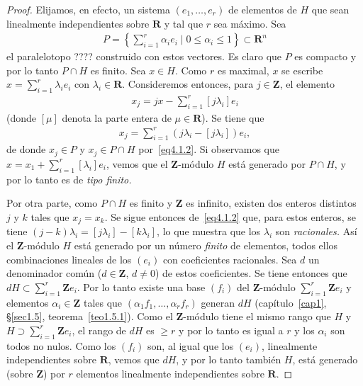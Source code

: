 \documentclass[oneside,bibtotoc,leqno,spanish]{amsbook}
\newcommand{\RR}{\mathbf{R}}
\newcommand{\ZZ}{\mathbf{Z}}
\numberwithin{equation}{section}
\theoremstyle{defi}
\theoremstyle{note}
\theoremstyle{rem}
\numberwithin{theorem}{section}
\numberwithin{proposition}{section}
\numberwithin{definition}{section}
\numberwithin{lemma}{section}
\numberwithin{corollary}{section}
\numberwithin{example}{section}
\numberwithin{footnote}{section}%
\begin{document}
\begin{proof}
Elijamos, en efecto, un sistema $(e_{1},\dots,e_{r})$ de elementos de $H$ que sean linealmente independientes
sobre $\RR$ y tal que $r$ sea m\'aximo. Sea
\begin{gather}
P = \left\{\sum_{i=1}^{r}\alpha_{i}e_{i}\mid 0\leq\alpha_{i}\leq 1\right\}\subset\RR^{n}
\end{gather}
el paralelotopo ???? construido con estos vectores. Es claro que $P$ es compacto y por lo tanto
$P\cap H$ es finito. Sea $x\in H$. Como $r$ es maximal, $x$ se escribe $x = \sum_{i=1}^{r}\lambda_{i}e_{i}$
con $\lambda_{i}\in\RR$. Consideremos entonces, para $j\in\ZZ$, el elemento
\begin{gather}\label{eq4.1.2}
x_{j} = jx-\sum_{i=1}^{r}[j\lambda_{i}]e_{i}
\end{gather}
(donde $[\mu]$ denota la parte entera de $\mu\in\RR$). Se tiene que
\begin{gather*}
x_{j} = \sum_{i=1}^{r}(j\lambda_{i}-[j\lambda_{i}])e_{i},
\end{gather*}
de donde $x_{j}\in P$ y $x_{j}\in P\cap H$ por~\eqref{eq4.1.2}. Si observamos que $x = x_{1}+\sum_{i=1}^{r}[\lambda_{i}]e_{i}$,
vemos que el $\ZZ$-m\'odulo $H$ est\'a generado por $P\cap H$, y por lo tanto es de {\em tipo finito.}

Por otra parte, como $P\cap H$ es finito y $\ZZ$ es infinito, existen dos enteros distintos $j$ y $k$
tales que $x_{j} = x_{k}$. Se sigue entonces de~\eqref{eq4.1.2} que, para estos enteros, se tiene
$(j-k)\lambda_{i} = [j\lambda_{i}]-[k\lambda_{i}]$, lo que muestra que los $\lambda_{i}$ son
{\em racionales.} As\'i el $\ZZ$-m\'odulo $H$ est\'a generado por un
n\'umero {\em finito} de elementos,
todos ellos combinaciones lineales de los $(e_{i})$ con coeficientes racionales.
Sea $d$ un denominador
com\'un ($d\in\ZZ$, $d\neq 0$) de estos coeficientes. Se tiene entonces
que $dH\subset\sum_{i=1}^{r}\ZZ e_{i}$.
Por lo tanto existe una base $(f_{i})$ del $\ZZ$-m\'odulo $\sum_{i=1}^{r}\ZZ e_{i}$ y elementos
$\alpha_{i}\in\ZZ$ tales que $(\alpha_{1}f_{1},\dots,\alpha_{r}f_{r})$ generan $dH$
(cap\'itulo~\ref{cap1}, \S\ref{sec1.5}, teorema~\ref{teo1.5.1}).
Como el $\ZZ$-m\'odulo tiene el mismo rango que $H$ y $H\supset\sum_{i=1}^{r}\ZZ e_{i}$,
el rango de
$dH$ es $\geq r$ y por lo tanto es igual a $r$ y los $\alpha_{i}$ son todos no nulos.
Como los $(f_{i})$
son, al igual que los $(e_{i})$, linealmente independientes sobre $\RR$, vemos que $dH$,
y por lo tanto
tambi\'en $H$, est\'a generado (sobre $\ZZ$) por $r$ elementos linealmente independientes
sobre $\RR$.
\end{proof}
\end{document}
